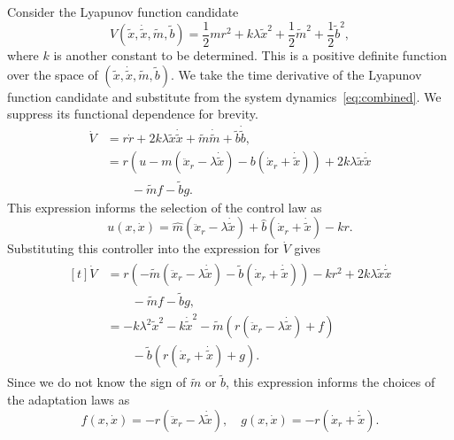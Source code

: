 Consider the Lyapunov function candidate
%
\begin{equation*}
    V(\tilde{x}, \dot{\tilde{x}}, \tilde{m}, \tilde{b}) = \frac{1}{2}mr^2 + 
    k\lambda\tilde{x}^2 + \frac{1}{2}\tilde{m}^2 + \frac{1}{2}\tilde{b}^2,
\end{equation*}
%
where $k$ is another constant to be determined. This is a positive definite
function over the space of $(\tilde{x}, \dot{\tilde{x}}, \tilde{m}, \tilde{b})$.
We take the time derivative of the Lyapunov function candidate and substitute
from the system dynamics~\eqref{eq:combined}. We suppress its functional
dependence for brevity.
%
\begin{align*}
    \dot{V} &= r\dot{r} + 2k\lambda\tilde{x}\dot{\tilde{x}} +
    \tilde{m}\dot{\tilde{m}} + \tilde{b}\dot{\tilde{b}}, \\
    &= r\left(u - m\left(\ddot{x}_r - \lambda\dot{\tilde{x}}\right)
    -b\left(\dot{x}_r + \dot{\tilde{x}} \right)\right) +
    2k\lambda\tilde{x}\dot{\tilde{x}} \\ &\phantom{1234}- \tilde{m}f - \tilde{b}g.
\end{align*}
%
This expression informs the selection of the control law as 
\begin{equation}
\boxed{u(x, 
\dot{x}) = \hat{m}\left(\ddot{x}_r - \lambda\dot{\tilde{x}}\right) +
\hat{b}\left(\dot{x}_r + \dot{\tilde{x}}\right) - kr}. 
\label{eq:controller}
\end{equation}
Substituting this
controller into the expression for $\dot{V}$ gives
%
\begin{align*}
\!\begin{aligned}[t]
    \dot{V} &= r\left(-\tilde{m}\left(\ddot{x}_r - \lambda\dot{\tilde{x}}\right) 
    - \tilde{b}\left(\dot{x}_r+\dot{\tilde{x}}\right)\right) - kr^2
    + 2k\lambda\tilde{x}\dot{\tilde{x}} \\
            &\phantom{1234} -\tilde{m}f - \tilde{b}g, \\
            &= -k\lambda^2\tilde{x}^2 - k\dot{\tilde{x}}^2 -
    \tilde{m}\left(r\left(\ddot{x}_r - \lambda\dot{\tilde{x}}\right) + f\right)
    \\
            &\phantom{1234} -\tilde{b}\left(r\left(\dot{x}_r +
    \dot{\tilde{x}}\right)+g\right).
\end{aligned}
\end{align*}
%
Since we do not know the sign of $\tilde{m}$ or $\tilde{b}$, this expression
informs the choices of the adaptation laws as
\begin{equation}
\boxed{f(x, \dot{x}) = -r\left(\ddot{x}_r - \lambda \dot{\tilde{x}}\right)}, \quad 
\boxed{g(x, \dot{x}) = -r\left( \dot{x}_r + \dot{\tilde{x}} \right)}.
\label{eq:adaptation}
\end{equation}
